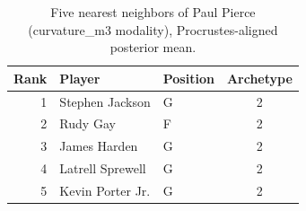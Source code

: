 \begin{table}[htbp]
  \centering\small
  \begin{tabular}{rllc}
    \toprule
    Rank & Player & Position & Archetype \\
    \midrule
    1 & Stephen Jackson & G & 2 \\
    2 & Rudy Gay & F & 2 \\
    3 & James Harden & G & 2 \\
    4 & Latrell Sprewell & G & 2 \\
    5 & Kevin Porter Jr. & G & 2 \\
    \bottomrule
  \end{tabular}
  \caption{Five nearest neighbors of Paul Pierce (curvature_m3 modality), Procrustes-aligned posterior mean.}
  \label{tab:Paul_Pierce_neighbors_curvature_m3}
\end{table}

